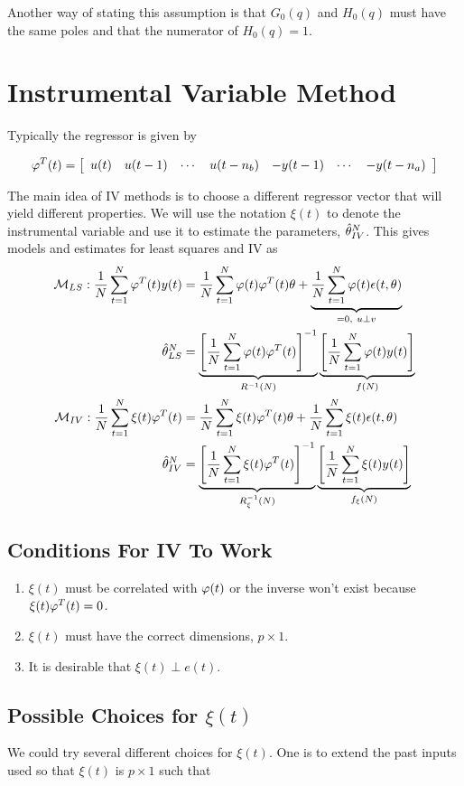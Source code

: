 Another way of stating this assumption is that $G_0(q)$ and $H_0(q)$ must have the same poles and that the numerator of $H_0(q)=1$.

\section{Instrumental Variable Method}
Typically the regressor is given by

\begin{equation*}
\varphi^T(t) = \left[\begin{array}{c c c c c c c} u(t) & u(t-1) & \cdots & u(t-n_b) & -y(t-1) & \cdots & -y(t-n_a) \end{array}\right]
\end{equation*}

The main idea of IV methods is to choose a different regressor vector that will yield different properties.
We will use the notation $\xi(t)$ to denote the instrumental variable and use it to estimate the parameters, $\hat{\theta}_{IV}^N$.
This gives models and estimates for least squares and IV as
\begin{align*}
\mathcal{M}_{LS}: \frac{1}{N}\sum_{t=1}^N\varphi^T(t)y(t) &= \frac{1}{N}\sum_{t=1}^N\varphi(t)\varphi^T(t)\theta + \underbrace{\frac{1}{N}\sum_{t=1}^N\varphi(t)\epsilon(t,\theta)}_{=0,~u\perp v} \\
\hat{\theta}_{LS}^N &= \underbrace{{\left[\frac{1}{N}\sum_{t=1}^N\varphi(t)\varphi^T(t)\right]}^{-1}}_{R^{-1}(N)} \underbrace{\left[\frac{1}{N}\sum_{t=1}^N\varphi(t)y(t)\right]}_{f(N)} \\
\mathcal{M}_{IV}: \frac{1}{N}\sum_{t=1}^N\xi(t)\varphi^T(t) &= \frac{1}{N}\sum_{t=1}^N\xi(t)\varphi^T(t)\theta + \frac{1}{N}\sum_{t=1}^N\xi(t)\epsilon(t,\theta) \\
\hat{\theta}_{IV}^N &= \underbrace{{\left[\frac{1}{N}\sum_{t=1}^N\xi(t)\varphi^T(t)\right]}^{-1}}_{R_\xi^{-1}(N)} \underbrace{\left[\frac{1}{N}\sum_{t=1}^N\xi(t)y(t)\right]}_{f_\xi(N)}
\end{align*}

\subsection{Conditions For IV To Work}
\begin{enumerate}
\item $\xi(t)$ must be correlated with $\varphi(t)$ or the inverse won't exist because $\xi(t)\varphi^T(t) = 0$.
\item $\xi(t)$ must have the correct dimensions, $p\times 1$.
\item It is desirable that $\xi(t)\perp e(t)$.
\end{enumerate}

\subsection{Possible Choices for $\xi(t)$}
We could try several different choices for $\xi(t)$.
One is to extend the past inputs used so that $\xi(t)$ is $p\times 1$ such that

